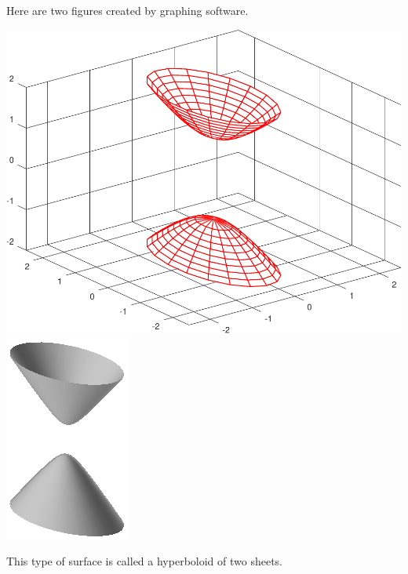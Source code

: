 \begin{eg}[$4x^2+y^2-z^2=-1$]
\begin{efig}
\begin{center}
\end{center}
\end{efig}
Here are two figures created by graphing software.
\begin{efig}
\begin{center}
   \includegraphics[scale=0.43]{hyperboloid2sheet.pdf}\qquad\qquad
   \includegraphics[scale=1.3]{hyperboloid2sheetDD.pdf}
\end{center}
\end{efig}
This type of surface is called a hyperboloid of two sheets. 
\end{eg}

